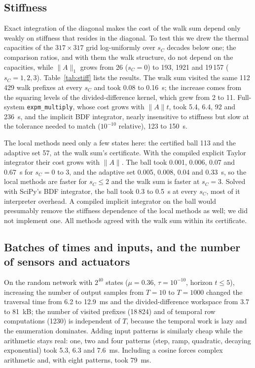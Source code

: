 


\subsection{Stiffness}\label{sec:stiff}
Exact integration of the diagonal makes the cost of the walk sum depend only weakly on stiffness that resides in the diagonal. To test this we drew the thermal capacities of the $317\times317$ grid log-uniformly over $s_C$ decades below one; the comparison ratios, and with them the walk structure, do not depend on the capacities, while $\|A\|_1$ grows from 26 ($s_C=0$) to 193, 1921 and 19\,157 ($s_C=1,2,3$). Table~\ref{tab:stiff} lists the results. The walk sum visited the same 112\,429 walk prefixes at every $s_C$ and took 0.08 to 0.16~s; the increase comes from the squaring levels of the divided-difference kernel, which grew from 2 to 11. Full-system \texttt{expm\_multiply}, whose cost grows with $\|A\|t$, took 5.4, 6.4, 92 and 236~s, and the implicit BDF integrator, nearly insensitive to stiffness but slow at the tolerance needed to match ($10^{-10}$ relative), 123 to 150~s.

The local methods need only a few states here: the certified ball 113 and the adaptive set 57, at the walk sum's certificate. With the compiled explicit Taylor integrator their cost grows with $\|A\|$. The ball took 0.001, 0.006, 0.07 and 0.67~s for $s_C=0$ to 3, and the adaptive set 0.005, 0.008, 0.04 and 0.33~s, so the local methods are faster for $s_C\le2$ and the walk sum is faster at $s_C=3$. Solved with SciPy's BDF integrator, the ball took 0.3 to 0.5~s at every $s_C$, most of it interpreter overhead. A compiled implicit integrator on the ball would presumably remove the stiffness dependence of the local methods as well; we did not implement one. All methods agreed with the walk sum within its certificate.



\subsection{Batches of times and inputs, and the number of sensors and actuators}\label{sec:batch}
On the random network with $2^{40}$ states ($\mu=0.36$, $\tau=10^{-10}$, horizon $t\le5$), increasing the number of output samples from $T=10$ to $T=1000$ changed the traversal time from 6.2 to 12.9~ms and the divided-difference workspace from 3.7 to 81~kB; the number of visited prefixes (18\,824) and of temporal row computations (1230) is independent of $T$, because the temporal work is lazy and the enumeration dominates. Adding input patterns is similarly cheap while the arithmetic stays real: one, two and four patterns (step, ramp, quadratic, decaying exponential) took 5.3, 6.3 and 7.6~ms. Including a cosine forces complex arithmetic and, with eight patterns, took 79~ms.

